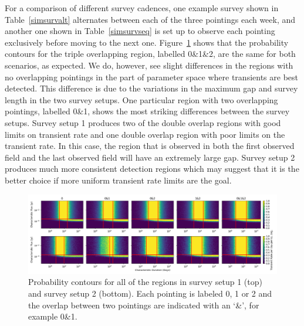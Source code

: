 \documentclass[12pt]{article}
\begin{document}
For a comparison of different survey cadences, one example survey shown in Table~\ref{simsurvalt} alternates between each of the three pointings each week, and another one shown in Table~\ref{simsurvseq} is set up to observe each pointing exclusively before moving to the next one. Figure~\ref{multirgnprob} shows that the probability contours for the triple overlapping region, labelled 0\&1\&2, are the same for both scenarios, as expected. We do, however, see slight differences in the regions with no overlapping pointings in the part of parameter space where transients are best detected. This difference is due to the variations in the maximum gap and survey length in the two survey setups. One particular region with two overlapping pointings, labelled 0\&1, shows the most striking differences between the survey setups. Survey setup 1 produces two of the double overlap regions with good limits on transient rate and one double overlap region with poor limits on the transient rate. In this case, the region that is observed in both the first observed field and the last observed field will have an extremely large gap. Survey setup 2 produces much more consistent detection regions which may suggest that it is the better choice if more uniform transient rate limits are the goal. 


 \begin{figure}
\includegraphics[width=\columnwidth]{multirgnprob.png}
\caption{Probability contours for all of the regions in survey setup 1 (top) and survey setup 2 (bottom). Each pointing is labeled 0, 1 or 2 and the overlap between two pointings are indicated with an `\&', for example 0\&1.}
\label{multirgnprob}
 \end{figure}
\end{document}
